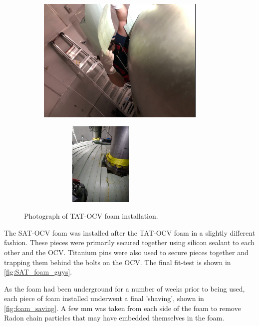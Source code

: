 \begin{figure}[!tbph]
\begin{subfigure}{.5\textwidth}
  \centering
  \includegraphics[height=6cm, width=\linewidth]{Figures/Construction/TAT_foam_installation.png}
  \end{subfigure}
  \begin{subfigure}{.5\textwidth}
  \centering
  \includegraphics[height=4cm, width=6cm, angle=-90, width=\linewidth]{Figures/Construction/TAT_foam_complete.jpg}
  \end{subfigure}
\caption{Photograph of TAT-OCV foam installation.}
\label{fig:TAT_foam_installation}
\end{figure}

\par
The SAT-OCV foam was installed after the TAT-OCV foam in a slightly different fashion.
These pieces were primarily secured together using silicon sealant \cite{dowsil_silicone_ref} to each other and the OCV.
Titanium pins were also used to secure pieces together and trapping them behind the bolts on the OCV.
The final fit-test is shown in \autoref{fig:SAT_foam_guys}.

\par
As the foam had been underground for a number of weeks prior to being used, each piece of foam installed underwent a final 'shaving', shown in \autoref{fig:foam_saving}.
A few mm was taken from each side of the foam to remove Radon chain particles that may have embedded themselves in the foam.

